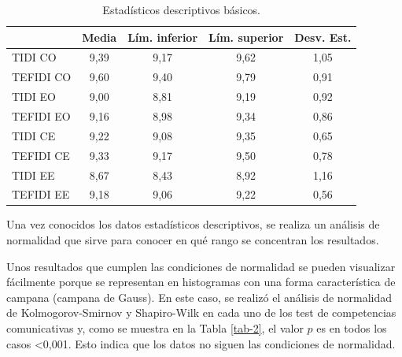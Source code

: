 \documentclass[spanish]{textolivre}
\begin{document}
\begin{table}[ht]
\centering
\begin{threeparttable}
\caption{Estadísticos descriptivos básicos.}\label{tab-1}
\begin{tabular}{lcccc}
\toprule
 & Media & Lím. inferior & Lím. superior & Desv. Est. \\
\midrule
TIDI CO     & 9,39 & 9,17 & 9,62 & 1,05 \\
TEFIDI CO   & 9,60 & 9,40 & 9,79 & 0,91 \\
TIDI EO     & 9,00 & 8,81 & 9,19 & 0,92 \\
TEFIDI EO   & 9,16 & 8,98 & 9,34 & 0,86 \\
TIDI CE     & 9,22 & 9,08 & 9,35 & 0,65 \\
TEFIDI CE   & 9,33 & 9,17 & 9,50 & 0,78 \\
TIDI EE     & 8,67 & 8,43 & 8,92 & 1,16 \\
TEFIDI EE   & 9,18 & 9,06 & 9,22 & 0,56 \\
\bottomrule
\end{tabular}
\end{threeparttable}
\end{table}

Una vez conocidos los datos estadísticos descriptivos, se realiza un análisis de normalidad que sirve para conocer en qué rango se concentran los resultados.

Unos resultados que cumplen las condiciones de normalidad se pueden visualizar fácilmente porque se representan en histogramas con una forma característica de campana (campana de Gauss). En este caso, se realizó el análisis de normalidad de Kolmogorov-Smirnov y Shapiro-Wilk en cada uno de los test de competencias comunicativas y, como se muestra en la Tabla \ref{tab-2}, el valor $p$ es en todos los casos <0,001. Esto indica que los datos no siguen las condiciones de normalidad.
\end{document}
